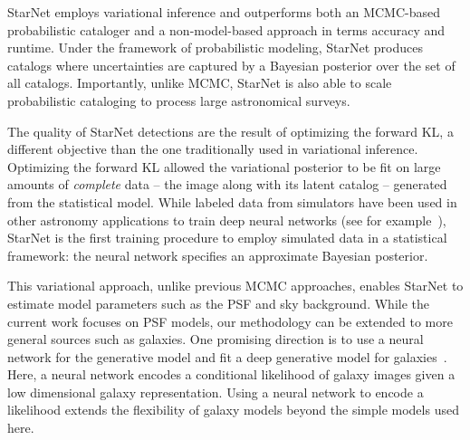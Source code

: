 StarNet employs variational inference and outperforms both an MCMC-based probabilistic cataloger and a non-model-based approach in terms accuracy and runtime. 
Under the framework of probabilistic modeling, 
StarNet produces catalogs where uncertainties are captured by a Bayesian posterior over the set of all catalogs.
Importantly, unlike MCMC, StarNet is also able to scale probabilistic cataloging to process large astronomical surveys. 

The quality of StarNet detections are the result of optimizing the forward KL, a different objective than the one traditionally used in variational inference. 
Optimizing the forward KL allowed the variational posterior to be fit on large amounts of {\itshape complete} data -- the image along with its latent catalog -- generated from the statistical model. 
While labeled data from simulators have been used in other astronomy applications to train deep neural networks (see for example~\cite{Lanusse_2017_cmudeeplens, huang2019finding}), StarNet is the first training procedure to employ simulated data in a statistical framework: the neural network specifies an approximate Bayesian posterior. 


This variational approach, unlike previous MCMC approaches, enables StarNet to estimate model parameters such as the PSF and sky background.
While the current work focuses on PSF models, our methodology can be extended to more general sources such as galaxies.
One promising direction is to use a neural network for the generative model and fit a deep generative model for galaxies~\cite{Regier2015ADG}. 
Here, a neural network encodes a conditional likelihood of galaxy images given a low dimensional galaxy representation. 
Using a neural network to encode a likelihood extends the flexibility of galaxy models beyond the simple models used here. 


